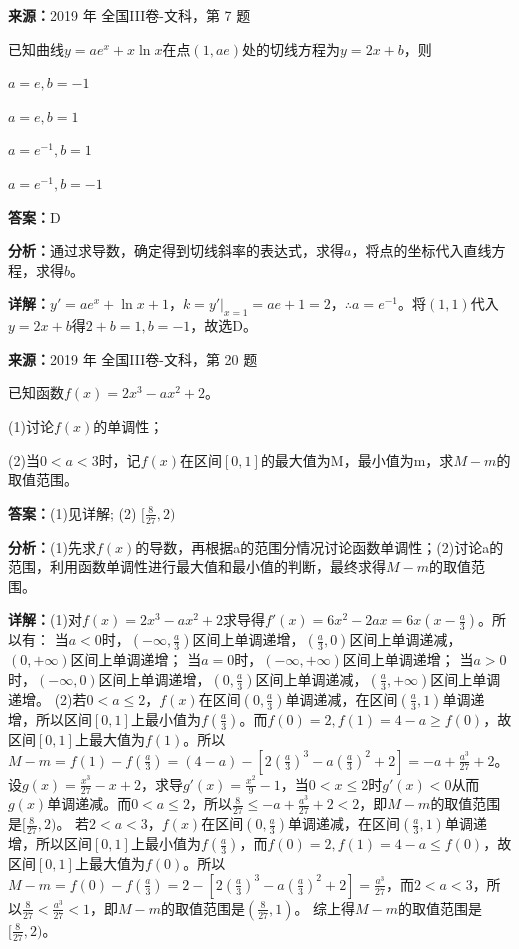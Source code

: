 \begin{question}[points=5]
\textbf{来源：}2019 年 全国III卷-文科，第 7 题\par
已知曲线$y=ae^x+x\ln x$在点$(1,ae)$处的切线方程为$y=2x+b$，则
\begin{choices}
  \item $a=e,b=-1$
  \item $a=e,b=1$
  \item $a=e^{-1},b=1$
  \item $a=e^{-1},b=-1$
\end{choices}
\begin{solution}
\textbf{答案：}D

\textbf{分析：}通过求导数，确定得到切线斜率的表达式，求得$a$，将点的坐标代入直线方程，求得$b$。

\textbf{详解：}$y'=ae^x+\ln x+1$，$k=y'|_{x=1}=ae+1=2$，$\therefore a=e^{-1}$。将$(1,1)$代入$y=2x+b$得$2+b=1,b=-1$，故选D。
\end{solution}
\end{question}

\begin{question}[points=12]
\textbf{来源：}2019 年 全国III卷-文科，第 20 题\par
已知函数$f(x)=2x^3-ax^2+2$。

(1)讨论$f(x)$的单调性；

(2)当$0<a<3$时，记$f(x)$在区间$[0,1]$的最大值为M，最小值为m，求$M-m$的取值范围。
\begin{solution}
\textbf{答案：}(1)见详解; (2) $[\frac{8}{27},2)$

\textbf{分析：}(1)先求$f(x)$的导数，再根据a的范围分情况讨论函数单调性；(2)讨论a的范围，利用函数单调性进行最大值和最小值的判断，最终求得$M-m$的取值范围。

\textbf{详解：}(1)对$f(x)=2x^3-ax^2+2$求导得$f'(x)=6x^2-2ax=6x(x-\frac{a}{3})$。所以有：
当$a<0$时，$(-\infty,\frac{a}{3})$区间上单调递增，$(\frac{a}{3},0)$区间上单调递减，$(0,+\infty)$区间上单调递增；
当$a=0$时，$(-\infty,+\infty)$区间上单调递增；
当$a>0$时，$(-\infty,0)$区间上单调递增，$(0,\frac{a}{3})$区间上单调递减，$(\frac{a}{3},+\infty)$区间上单调递增。
(2)若$0<a\le2$，$f(x)$在区间$(0,\frac{a}{3})$单调递减，在区间$(\frac{a}{3},1)$单调递增，所以区间$[0,1]$上最小值为$f(\frac{a}{3})$。而$f(0)=2,f(1)=4-a\ge f(0)$，故区间$[0,1]$上最大值为$f(1)$。所以$M-m=f(1)-f(\frac{a}{3})=(4-a)-[2(\frac{a}{3})^3-a(\frac{a}{3})^2+2]=-a+\frac{a^3}{27}+2$。设$g(x)=\frac{x^3}{27}-x+2$，求导$g'(x)=\frac{x^2}{9}-1$，当$0<x\le2$时$g'(x)<0$从而$g(x)$单调递减。而$0<a\le2$，所以$\frac{8}{27}\le -a+\frac{a^3}{27}+2<2$，即$M-m$的取值范围是$[\frac{8}{27},2)$。
若$2<a<3$，$f(x)$在区间$(0,\frac{a}{3})$单调递减，在区间$(\frac{a}{3},1)$单调递增，所以区间$[0,1]$上最小值为$f(\frac{a}{3})$，而$f(0)=2,f(1)=4-a\le f(0)$，故区间$[0,1]$上最大值为$f(0)$。所以$M-m=f(0)-f(\frac{a}{3})=2-[2(\frac{a}{3})^3-a(\frac{a}{3})^2+2]=\frac{a^3}{27}$，而$2<a<3$，所以$\frac{8}{27}<\frac{a^3}{27}<1$，即$M-m$的取值范围是$(\frac{8}{27},1)$。
综上得$M-m$的取值范围是$[\frac{8}{27},2)$。
\end{solution}
\end{question}

